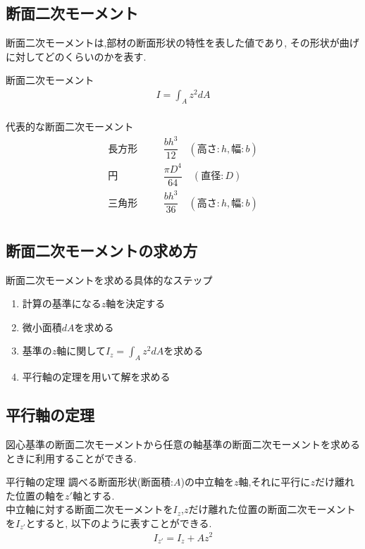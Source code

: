 \documentclass[a4paper]{jsarticle}
\begin{document}
\subsection{断面二次モーメント}
断面二次モーメントは,部材の断面形状の特性を表した値であり,
その形状が曲げに対してどのくらいのかを表す.
\begin{itembox}[l]{断面二次モーメント}
    \begin{eqnarray*}
        \displaystyle I=\int_Az^2dA\\
    \end{eqnarray*}
\end{itembox}
\begin{itembox}[l]{代表的な断面二次モーメント}
    \begin{eqnarray*}
        長方形\quad&&\dfrac{bh^3}{12}\quad(高さ:h,幅:b)\\
        円\qquad&&\dfrac{\pi D^4}{64}\quad(直径:D)\\
        三角形\quad&&\dfrac{bh^3}{36}\quad(高さ:h,幅:b)\\
    \end{eqnarray*}
\end{itembox}
\subsection{断面二次モーメントの求め方}
\begin{itembox}[l]{断面二次モーメントを求める具体的なステップ}
    \begin{enumerate}[(1)]
        \item 計算の基準になる$z$軸を決定する
        \item 微小面積$dA$を求める
        \item 基準の$z$軸に関して$I_z=\int_Az^2dA$を求める
        \item 平行軸の定理を用いて解を求める
    \end{enumerate}
\end{itembox}
\subsection{平行軸の定理}
図心基準の断面二次モーメントから任意の軸基準の断面二次モーメントを求めるときに利用することができる.
\begin{itembox}[l]{平行軸の定理}
    調べる断面形状(断面積:$A$)の中立軸を$z$軸,それに平行に$z$だけ離れた位置の軸を$z'$軸とする.\\
    中立軸に対する断面二次モーメントを$I_z$,$z$だけ離れた位置の断面二次モーメントを$I_{z'}$とすると,
    以下のように表すことができる.
    \begin{eqnarray*}
        I_{z'}=I_z+Az^2\\
    \end{eqnarray*}
\end{itembox}
\end{document}
